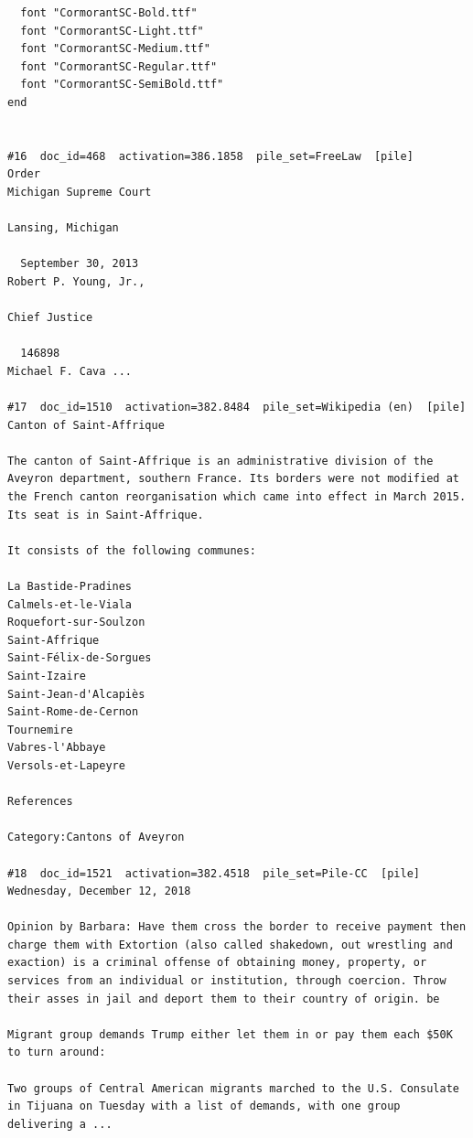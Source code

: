 \begin{verbatim}
  font "CormorantSC-Bold.ttf"
  font "CormorantSC-Light.ttf"
  font "CormorantSC-Medium.ttf"
  font "CormorantSC-Regular.ttf"
  font "CormorantSC-SemiBold.ttf"
end


#16  doc_id=468  activation=386.1858  pile_set=FreeLaw  [pile]
Order                                                                                       Michigan Supreme Court
                                                                                                  Lansing, Michigan

  September 30, 2013                                                                                  Robert P. Young, Jr.,
                                                                                                                Chief Justice

  146898                                                                                              Michael F. Cava ...

#17  doc_id=1510  activation=382.8484  pile_set=Wikipedia (en)  [pile]
Canton of Saint-Affrique

The canton of Saint-Affrique is an administrative division of the Aveyron department, southern France. Its borders were not modified at the French canton reorganisation which came into effect in March 2015. Its seat is in Saint-Affrique.

It consists of the following communes:
 
La Bastide-Pradines
Calmels-et-le-Viala
Roquefort-sur-Soulzon
Saint-Affrique
Saint-Félix-de-Sorgues
Saint-Izaire
Saint-Jean-d'Alcapiès
Saint-Rome-de-Cernon
Tournemire
Vabres-l'Abbaye
Versols-et-Lapeyre

References

Category:Cantons of Aveyron

#18  doc_id=1521  activation=382.4518  pile_set=Pile-CC  [pile]
Wednesday, December 12, 2018

Opinion by Barbara: Have them cross the border to receive payment then charge them with Extortion (also called shakedown, out wrestling and exaction) is a criminal offense of obtaining money, property, or services from an individual or institution, through coercion. Throw their asses in jail and deport them to their country of origin. be

Migrant group demands Trump either let them in or pay them each $50K to turn around:

Two groups of Central American migrants marched to the U.S. Consulate in Tijuana on Tuesday with a list of demands, with one group delivering a ...


\end{verbatim}
